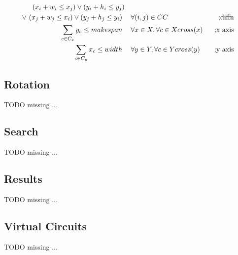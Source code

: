     \begin{align}
        (x_i + w_i \leq x_j) \lor (y_i + h_i \leq y_j) &\ \ &\ \nonumber \\
        \lor\ (x_j + w_j \leq x_i) \lor (y_j + h_j \leq y_i)\ &\                \hspace{0.2cm} \forall (i,j) \in CC &\ \text{;diffn} \\
                                                                        \sum_{c \in C_x} y_c \leq makespan\ &\ \hspace{0.2cm} \forall x \in X, \forall c \in Xcross(x)\ &\ \text{;x axis} \\
                                                                           \sum_{c \in C_y} x_c \leq width\ &\ \hspace{0.2cm} \forall y \in Y, \forall c \in Ycross(y)\ &\ \text{;y axis}
    \end{align}


\subsection{Rotation}
    \colorbox{BurntOrange}{TODO missing ...}


\subsection{Search}
    \colorbox{BurntOrange}{TODO missing ...}


\subsection{Results}
    \colorbox{BurntOrange}{TODO missing ...}


\subsection{Virtual Circuits}
    \colorbox{BurntOrange}{TODO missing ...}
